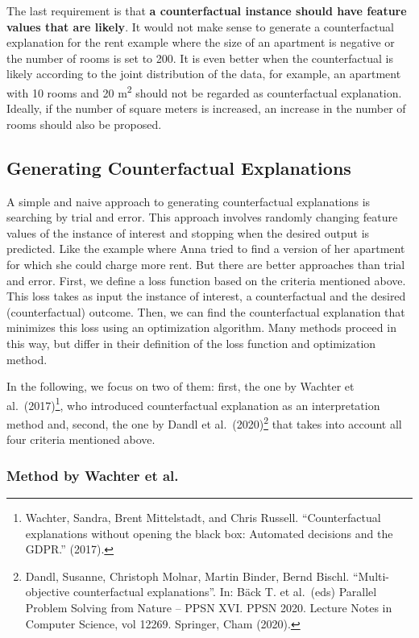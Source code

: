 \documentclass[
  10pt,
]{scrbook}
\begin{document}
The last requirement is that \textbf{a counterfactual instance should have feature values that are likely}.
It would not make sense to generate a counterfactual explanation for the rent example where the size of an apartment is negative or the number of rooms is set to 200.
It is even better when the counterfactual is likely according to the joint distribution of the data, for example, an apartment with 10 rooms and 20 m\textsuperscript{2} should not be regarded as counterfactual explanation.
Ideally, if the number of square meters is increased, an increase in the number of rooms should also be proposed.

\hypertarget{generating-counterfactual-explanations}{%
\subsection{Generating Counterfactual Explanations}\label{generating-counterfactual-explanations}}

A simple and naive approach to generating counterfactual explanations is searching by trial and error.
This approach involves randomly changing feature values of the instance of interest and stopping when the desired output is predicted.
Like the example where Anna tried to find a version of her apartment for which she could charge more rent.
But there are better approaches than trial and error.
First, we define a loss function based on the criteria mentioned above.
This loss takes as input the instance of interest, a counterfactual and the desired (counterfactual) outcome.
Then, we can find the counterfactual explanation that minimizes this loss using an optimization algorithm.
Many methods proceed in this way, but differ in their definition of the loss function and optimization method.

In the following, we focus on two of them: first, the one by Wachter et al.~(2017)\footnote{Wachter, Sandra, Brent Mittelstadt, and Chris Russell. ``Counterfactual explanations without opening the black box: Automated decisions and the GDPR.'' (2017).}, who introduced counterfactual explanation as an interpretation method and, second, the one by Dandl et al.~(2020)\footnote{Dandl, Susanne, Christoph Molnar, Martin Binder, Bernd Bischl. ``Multi-objective counterfactual explanations''. In: Bäck T. et al.~(eds) Parallel Problem Solving from Nature -- PPSN XVI. PPSN 2020. Lecture Notes in Computer Science, vol 12269. Springer, Cham (2020).} that takes into account all four criteria mentioned above.

\hypertarget{method-by-wachter-et-al.}{%
\subsubsection{Method by Wachter et al.~}\label{method-by-wachter-et-al.}}
\end{document}
